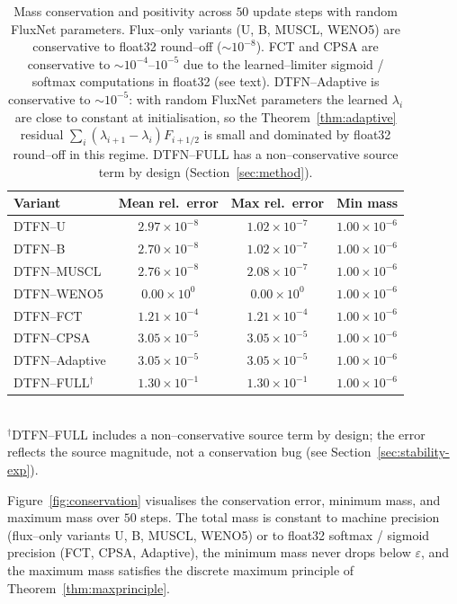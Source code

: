 \documentclass[10pt]{article}
\theoremstyle{definition}
\theoremstyle{remark}
\newcommand{\Eps}{\varepsilon}
\begin{document}
\begin{table}[h]
  \centering
  \caption{Mass conservation and positivity across $50$ update steps
    with random FluxNet parameters.  Flux--only variants (U, B, MUSCL,
    WENO5) are conservative to float32 round--off ($\sim 10^{-8}$).
    FCT and CPSA are conservative to $\sim 10^{-4}$--$10^{-5}$ due to
    the learned--limiter sigmoid / softmax computations in float32
    (see text).  DTFN--Adaptive is conservative to $\sim 10^{-5}$:
    with random FluxNet parameters the learned $\lambda_i$ are close
    to constant at initialisation, so the Theorem~\ref{thm:adaptive}
    residual $\sum_i (\lambda_{i+1}-\lambda_i) F_{i+1/2}$ is small and
    dominated by float32 round--off in this regime.  DTFN--FULL has a
    non--conservative source term by design
    (Section~\ref{sec:method}).}
  \label{tab:conservation}
  \begin{tabular}{lccc}
    \toprule
    Variant & Mean rel.\ error & Max rel.\ error & Min mass \\
    \midrule
    DTFN--U       & $2.97\times 10^{-8}$ & $1.02\times 10^{-7}$ & $1.00\times 10^{-6}$ \\
    DTFN--B       & $2.70\times 10^{-8}$ & $1.02\times 10^{-7}$ & $1.00\times 10^{-6}$ \\
    DTFN--MUSCL   & $2.76\times 10^{-8}$ & $2.08\times 10^{-7}$ & $1.00\times 10^{-6}$ \\
    DTFN--WENO5   & $0.00\times 10^{0}$  & $0.00\times 10^{0}$  & $1.00\times 10^{-6}$ \\
    DTFN--FCT     & $1.21\times 10^{-4}$ & $1.21\times 10^{-4}$ & $1.00\times 10^{-6}$ \\
    DTFN--CPSA    & $3.05\times 10^{-5}$ & $3.05\times 10^{-5}$ & $1.00\times 10^{-6}$ \\
    DTFN--Adaptive& $3.05\times 10^{-5}$ & $3.05\times 10^{-5}$ & $1.00\times 10^{-6}$ \\
    DTFN--FULL$^\dagger$ & $1.30\times 10^{-1}$ & $1.30\times 10^{-1}$ & $1.00\times 10^{-6}$ \\
    \bottomrule
  \end{tabular}\\
  \smallskip
  \footnotesize $^\dagger$DTFN--FULL includes a non--conservative
  source term by design; the error reflects the source magnitude, not a
  conservation bug (see Section~\ref{sec:stability-exp}).
\end{table}

Figure~\ref{fig:conservation} visualises the conservation error,
minimum mass, and maximum mass over $50$ steps.  The total mass is
constant to machine precision (flux--only variants U, B, MUSCL, WENO5)
or to float32 softmax / sigmoid precision (FCT, CPSA, Adaptive), the
minimum mass never drops below
$\Eps$, and the maximum mass satisfies the discrete maximum principle
of Theorem~\ref{thm:maxprinciple}.
\end{document}

